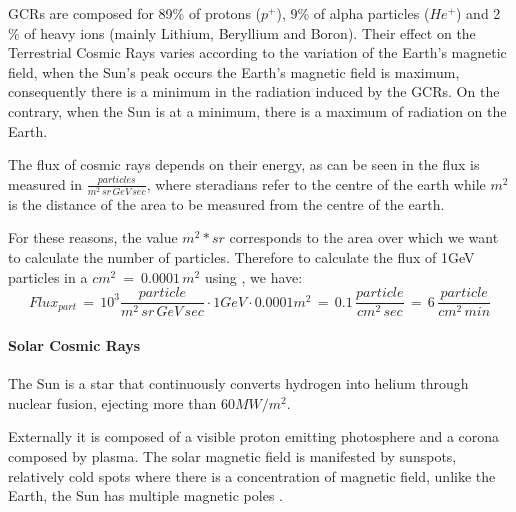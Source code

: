 {{{{{						GCRs are composed for 89\% of protons ($p^+$), 9\%  of 	alpha particles ($He^+$) and 2	\% of heavy ions (mainly Lithium, Beryllium and Boron). Their effect on the Terrestrial Cosmic Rays varies according to the variation of the Earth's magnetic field, when the Sun's peak occurs the Earth's magnetic field is maximum, consequently there is a minimum in the radiation induced by the GCRs. On the contrary, when the Sun is at a minimum, there is a maximum of radiation on the Earth.

						The flux of cosmic rays depends on their energy, as can be seen in  the flux is measured in $\frac{particles}{m^2\,sr\,GeV \,sec}$, where steradians refer to the centre of the earth while $m^2$ is the distance of the area to be measured from the centre of the earth.
						
						For these reasons, the value $m^2*sr$ corresponds to the area over which we want to calculate the number of particles. Therefore to calculate the flux of 1GeV particles  in a $cm^2\:=\:0.0001\,m^2$ using , we have:
						\begin{equation}
							Flux_{part}\,=\,10^3 \frac{particle}{m^2\,sr\,GeV\,sec}\cdot 1GeV \cdot 0.0001m^2 \, =\, 0.1\,\frac{particle}{cm^2\,sec} \,=\, 6\,\frac{particle}{cm^2\,min}
						\end{equation} 
						
						
				}%
				  
				\paragraph{Solar Cosmic Rays}{
					The Sun is a star that continuously converts hydrogen into helium through nuclear fusion, ejecting more than $60MW/m^2$. 
					
					Externally it is composed of a visible proton emitting photosphere and a corona composed by plasma. The solar magnetic field is manifested by sunspots, relatively cold spots where there is a concentration of magnetic field, unlike the Earth, the Sun has multiple magnetic poles  . \\
					
}}}}}
